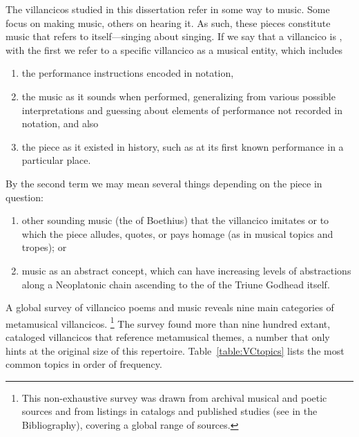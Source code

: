 The villancicos studied in this dissertation refer in some way to music.
Some focus on making music, others on hearing it.
As such, these pieces constitute music that refers to itself---singing about
singing.%
    \autocites{Murata:Singing}
    [\XXX]{Illari:Polychoral}
If we say that a villancico is , with the first  we refer to a specific villancico as a musical entity, which includes 
\begin{enumerate}
\item the performance instructions encoded in notation,
\item the music as it sounds when performed, generalizing from various possible interpretations and guessing about elements of performance not recorded in notation, and also
\item the piece as it existed in history, such as at its first known performance in a particular place.
\end{enumerate}
%
By the second term  we may mean several things depending on the piece in question: 
\begin{enumerate}
\item other sounding music (the  of Boethius) that the villancico imitates or to which the piece alludes, quotes, or pays homage (as in musical topics and tropes); or 
\item music as an abstract concept, which can have increasing levels of abstractions along a Neoplatonic chain ascending to the  of the Triune Godhead itself.
\end{enumerate}

A global survey of villancico poems and music reveals nine main categories of metamusical villancicos.%
	\footnote{%
	This non-exhaustive survey was drawn from archival musical and poetic sources and from listings in catalogs and published studies (see  in the Bibliography), covering a global range of sources.
	}
The survey found more than nine hundred extant, cataloged villancicos that reference metamusical themes, a number that only hints at the original size of this repertoire.
Table~\ref{table:VCtopics} lists the most common topics in order of frequency.

%	
%
